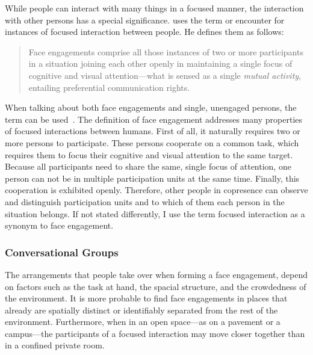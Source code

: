 While people can interact with many things in a focused manner, the interaction with other persons has a special significance.
\citeauthor*{goffman1963} uses the term or \gls{encounter} for instances of \gls{focused interaction} between people.  
He defines them as follows:
\blockcquote[p. 89]{goffman1963}{Face engagements comprise all those instances of two or more participants in a situation joining each other openly in maintaining a single focus of cognitive and visual attention---what is sensed as a single \emph{mutual activity}, entailing preferential communication rights.}
When talking about both \glspl{face engagement} and single, unengaged persons, the term can be used~\cite[p.91]{goffman1963}.
The definition of \gls{face engagement} addresses many properties of \glspl{focused interaction} between humans.
First of all, it naturally requires two or more persons to participate.
These persons cooperate on a common task, which requires them to focus their cognitive and visual attention to the same target.
Because all participants need to share the same, single focus of attention, one person can not be in multiple \glspl{participation unit} at the same time.
Finally, this cooperation is exhibited openly.
Therefore, other people in \gls{copresence} can observe and distinguish \glspl{participation unit} and to which of them each person in the situation belongs.
If not stated differently, I use the term \gls{focused interaction} as a synonym to \gls{face engagement}.

\subsubsection{Conversational Groups}\label{sec.rw.hi.cg}

The arrangements that people take over when forming a \gls{face engagement}, depend on factors such as the task at hand, the spacial structure, and the crowdedness of the environment.
It is more probable to find \glspl{face engagement} in places that already are spatially distinct or identifiably separated from the rest of the environment.
Furthermore, when in an open space---as on a pavement or a campus---the participants of a \gls{focused interaction} may move closer together than in a confined private room.

